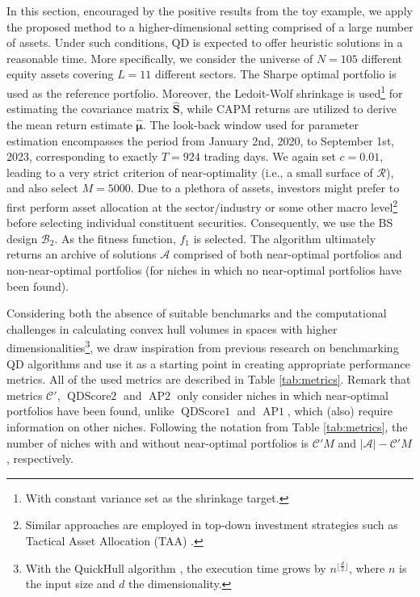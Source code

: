 In this section, encouraged by the positive results from the toy example, we apply the proposed method to a higher-dimensional setting comprised of a large number of assets. Under such conditions, QD is expected to offer heuristic solutions in a reasonable time. More specifically, we consider the universe of $N=105$ different equity assets covering $L=11$ different sectors. The Sharpe optimal portfolio is used as the reference portfolio. Moreover, the Ledoit-Wolf shrinkage\cite{ledoit} is used\footnote{With constant variance set as the shrinkage target.} for estimating the covariance matrix $\boldsymbol{\hat{S}}$, while CAPM returns \cite{famafrench} are utilized to derive the mean return estimate $\boldsymbol{\hat{\mu}}$. The look-back window used for parameter estimation encompasses the period from January 2nd, 2020, to September 1st, 2023, corresponding to exactly $T=924$ trading days. We again set $c=0.01$, leading to a very strict criterion of near-optimality (i.e., a small surface of $\mathcal{R}$), and also select $M=5000$. Due to a plethora of assets, investors might prefer to first perform asset allocation at the sector/industry or some other macro level\footnote{Similar approaches are employed in top-down investment strategies such as Tactical Asset Allocation (TAA) \cite{faber}.} before selecting individual constituent securities. Consequently, we use the BS design $\mathcal{B}_2$. As the fitness function, $f_1$ is selected. The algorithm ultimately returns an archive of solutions $\mathcal{A}$ comprised of both near-optimal portfolios and non-near-optimal portfolios (for niches in which no near-optimal portfolios have been found).

Considering both the absence of suitable benchmarks and the computational challenges in calculating convex hull volumes in spaces with higher dimensionalities\footnote{With the QuickHull algorithm \cite{barber}, the execution time grows by $n^{\lfloor \frac{d}{2} \rfloor}$, where $n$ is the input size and $d$ the dimensionality.}, we draw inspiration from previous research on benchmarking QD algorithms \cite{flageat} and use it as a starting point in creating appropriate performance metrics. All of the used metrics are described in Table \ref{tab:metrics}. Remark that metrics $\mathcal{C'}$, $\operatorname{QDScore2}$ and $\operatorname{AP2}$ only consider niches in which near-optimal portfolios have been found, unlike $\operatorname{QDScore1}$ and $\operatorname{AP1}$, which (also) require information on other niches. Following the notation from Table \ref{tab:metrics}, the number of niches with and without near-optimal portfolios is $\mathcal{C'}M$ and $|\mathcal{A}|-\mathcal{C'}M$, respectively.


